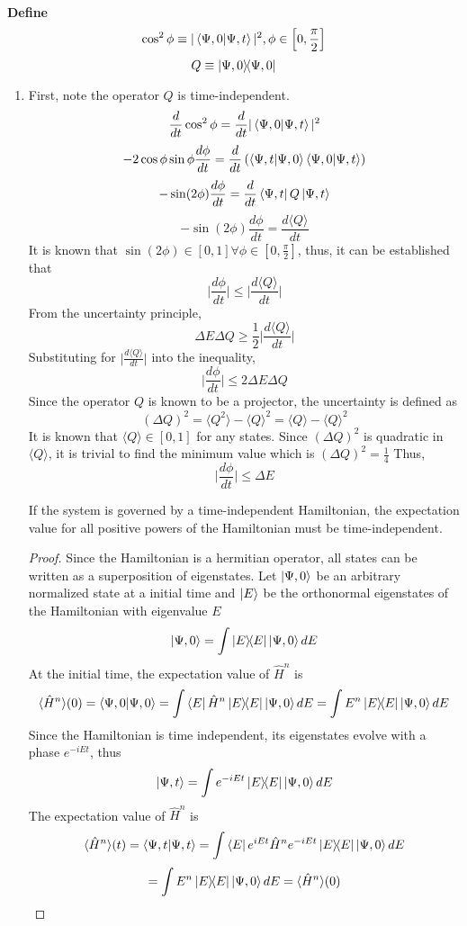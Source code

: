 \begin{sol}
\\\textbf{Define}
$$\cos^2\phi\equiv|\braket{\Psi,0}{\Psi,t}|^2,\phi\in\left[0,\frac{\pi}{2}\right]$$
$$Q\equiv\ketbra{\Psi,0}{\Psi,0}$$
\begin{enumerate}[label=\textbf{(\alph*)}]
\item
First, note the operator $Q$ is time-independent. 
$$\frac{d}{dt}\cos^2\phi=\frac{d}{dt}|\braket{\Psi,0}{\Psi,t}|^2$$
$$-2\cos\phi\sin\phi\frac{d\phi}{dt}=\frac{d}{dt}\left(\braket{\Psi,t}{\Psi,0}\braket{\Psi,0}{\Psi,t}\right)$$
$$-\sin(2\phi)\frac{d\phi}{dt}=\frac{d}{dt}\bra{\Psi,t}Q\ket{\Psi,t}$$
$$-\sin(2\phi)\frac{d\phi}{dt}=\frac{d\langle Q\rangle}{dt}$$
It is known that $\sin(2\phi)\in[0,1]\forall\phi\in\left[0,\frac{\pi}{2}\right]$, thus, it can be established that
$$\bigg|\frac{d\phi}{dt}\bigg|\leq\bigg|\frac{d\langle Q\rangle}{dt}\bigg|$$
From the uncertainty principle,
$$\Delta E\Delta Q\geq\frac{1}{2}\bigg|\frac{d\langle Q\rangle}{dt}\bigg|$$
Substituting for $\big|\frac{d\langle Q\rangle}{dt}\big|$ into the inequality,
$$\bigg|\frac{d\phi}{dt}\bigg|\leq 2\Delta E\Delta Q$$
Since the operator $Q$ is known to be a projector, the uncertainty is defined as 
$$(\Delta Q)^2=\langle Q^2\rangle-\langle Q\rangle^2=\langle Q\rangle-\langle Q\rangle^2$$
It is known that $\langle Q\rangle\in[0,1]$ for any states. Since $(\Delta Q)^2$ is quadratic in $\langle Q\rangle$, it is trivial to find the minimum value which is $(\Delta Q)^2=\frac{1}{4}$ Thus,
$$\bigg|\frac{d\phi}{dt}\bigg|\leq \Delta E$$
\begin{lemma}
If the system is governed by a time-independent Hamiltonian, the expectation value for all positive powers of the Hamiltonian must be time-independent.
\end{lemma}
\begin{proof}
Since the Hamiltonian is a hermitian operator, all states can be written as a superposition of eigenstates. Let $\ket{\Psi,0}$ be an arbitrary normalized state at a initial time and $\ket{E}$ be the orthonormal eigenstates of the Hamiltonian with eigenvalue $E$
$$\ket{\Psi,0}=\int\ketbra{E}{E}\ket{\Psi,0} dE$$
At the initial time, the expectation value of $\hat H^n$ is
$$\langle \hat H^n\rangle(0)=\braket{\Psi,0}{\Psi,0}=\int\bra{E}\hat H^n\ketbra{E}{E}\ket{\Psi,0}dE=\int E^n\ketbra{E}{E}\ket{\Psi,0}dE$$
Since the Hamiltonian is time independent, its eigenstates evolve with a phase $e^{-iEt}$, thus
$$\ket{\Psi,t}=\int e^{-iEt}\ketbra{E}{E}\ket{\Psi,0} dE$$
The expectation value of $\hat H^n$ is
$$\langle \hat H^n\rangle(t)=\braket{\Psi,t}{\Psi,t}=\int\bra{E}e^{iEt}\hat H^ne^{-iEt}\ketbra{E}{E}\ket{\Psi,0}dE$$$$=\int E^n\ketbra{E}{E}\ket{\Psi,0}dE=\langle \hat H^n\rangle(0)$$

\end{proof}
\end{enumerate}
\end{sol}
